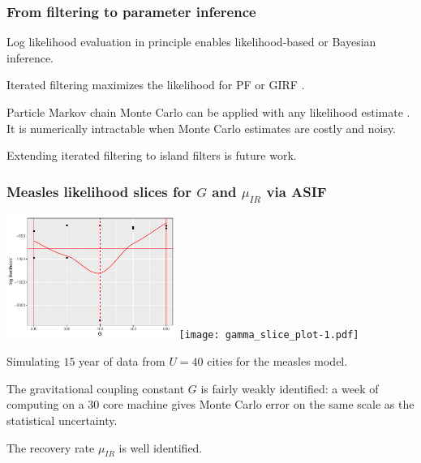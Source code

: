 \documentclass{beamer}
\begin{document}
\begin{frame}
\frametitle{From filtering to parameter inference}

\begin{myitemize}
\item Log likelihood evaluation in principle enables likelihood-based or Bayesian inference.

\vspace{3mm}

\item Iterated filtering maximizes the likelihood for PF or GIRF \citep{ionides15}.

\vspace{3mm}

\item Particle Markov chain Monte Carlo can be applied with any likelihood estimate \citep{andrieu10}. It is numerically intractable when Monte Carlo estimates are costly and noisy.

\vspace{3mm}

\item Extending iterated filtering to island filters is future work.

\end{myitemize}

\end{frame}

\begin{frame}

\frametitle{Measles likelihood slices for $G$ and $\mu_{IR}$ via ASIF}

\vspace{-3mm}

\includegraphics[width=5.5cm]{slice_plot-1.pdf}
\texttt{[image: gamma\_slice\_plot-1.pdf]}

\begin{myitemize}
\item 
Simulating $15$ year of data from $U=40$ cities for the measles model.
\item
The gravitational coupling constant $G$ is fairly weakly identified: a week of computing on a 30 core machine gives Monte Carlo error on the same scale as the statistical uncertainty.
\item
The recovery rate $\mu_{IR}$ is well identified.
\end{myitemize}
\vspace{-2mm}

\end{frame}
\end{document}
